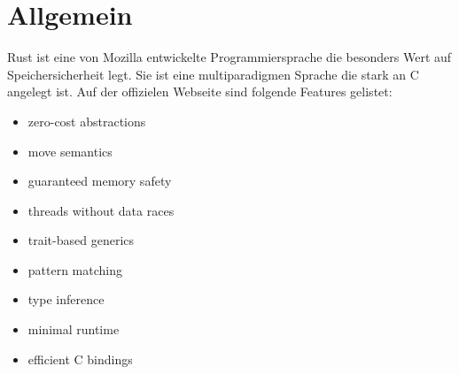\section{Allgemein}
Rust ist eine von Mozilla entwickelte Programmiersprache die besonders Wert auf Speichersicherheit legt.
Sie ist eine multiparadigmen Sprache die stark an C angelegt ist.
Auf der offizielen Webseite sind folgende Features gelistet:

\begin{itemize}	
\item zero-cost abstractions
\item move semantics
\item guaranteed memory safety
\item threads without data races
\item trait-based generics
\item pattern matching
\item type inference
\item minimal runtime
\item efficient C bindings
\end{itemize}









